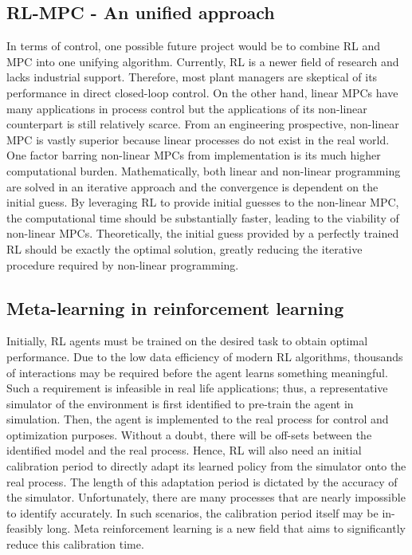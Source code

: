 \subsection{RL-MPC - An unified approach}
In terms of control, one possible future project would be to combine RL and MPC into one unifying algorithm.  Currently, RL is a newer field of research and lacks industrial support. Therefore, most plant managers are skeptical of its performance in direct closed-loop control. On the other hand, linear MPCs have many applications in process control but the applications of its non-linear counterpart is still relatively scarce. From an engineering prospective, non-linear MPC is vastly superior because linear processes do not exist in the real world. One factor barring non-linear MPCs from implementation is its much higher computational burden. Mathematically, both linear and non-linear programming are solved in an iterative approach and the convergence is dependent on the initial guess.  By leveraging RL to provide initial guesses to the non-linear MPC, the computational time should be substantially faster, leading to the viability of non-linear MPCs. Theoretically, the initial guess provided by a perfectly trained RL should be exactly the optimal solution, greatly reducing the iterative procedure required by non-linear programming.  

\subsection{Meta-learning in reinforcement learning}
Initially, RL agents must be trained on the desired task to obtain optimal performance.  Due to the low data efficiency of modern RL algorithms, thousands of interactions may be required before the agent learns something meaningful.  Such a requirement is infeasible in real life applications; thus, a representative simulator of the environment is first identified to pre-train the agent in simulation.  Then, the agent is implemented to the real process for control and optimization purposes.  Without a doubt, there will be off-sets between the identified model and the real process. Hence, RL will also need an initial calibration period to directly adapt its learned policy from the simulator onto the real process.  The length of this adaptation period is dictated by the accuracy of the simulator.  Unfortunately, there are many processes that are nearly impossible to identify accurately.  In such scenarios, the calibration period itself may be in-feasibly long. Meta reinforcement learning is a new field that aims to significantly reduce this calibration time.

